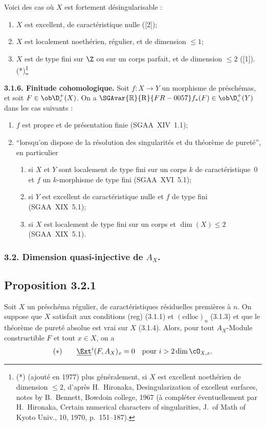 Voici des cas où $X$ est fortement désingularisable :
\begin{enumerate}
\item[a)] $X$ est excellent, de caractéristique nulle ([2]);
\item[b)] $X$ est localement noethérien, régulier, et de dimension $\leqslant 1$;
\item[c)] $X$ est de type fini sur $\Z$ ou sur un corps parfait, et de dimension $\leqslant 2$ ([1]).(*)\footnote{(*) (ajouté en 1977) plus généralement, si $X$ est excellent noethérien de dimension $\leqslant 2$, d'après H.~Hironaka, Desingularization of excellent surfaces, notes by B.~Bennett, Bowdoin college, 1967 (à compléter éventuellement par H.~Hironaka, Certain numerical characters of singularities, J.~of Math of Kyoto Univ., 10, 1970, p.~151--187).}
\end{enumerate}

\textbf{3.1.6. Finitude cohomologique.} Soit $f : X \to Y$ un morphisme de préschémas, et soit $F \in \ob \D_c^{+}(X)$. On a $\SGAvar{\mathbb{R}}{\mathrm{R}}{FR-0057} f_{*}(F) \in \ob \D_c^{+}(Y)$ dans les cas suivants :
\begin{enumerate}
\item[a)] $f$ est propre et de présentation finie (SGAA~XIV~1.1);
\item[b)] ``lorsqu'on dispose de la résolution des singularités et du théorème de pureté'', en particulier
\begin{enumerate}
\item[(i)] si $X$ et $Y$ sont localement de type fini sur un corps $k$ de caractéristique~0 et $f$ un $k$-morphisme de type fini (SGAA~XVI~5.1);
\item[(ii)] si $Y$ est excellent de caractéristique nulle et $f$ de type fini (SGAA~XIX~5.1);
\item[(iii)] si $X$ est localement de type fini sur un corps et $\dim(X) \leqslant 2$ (SGAA~XIX~5.1).
\end{enumerate}
\end{enumerate}

\subsubsection*{3.2. Dimension quasi-injective de \texorpdfstring{$A_X$}{A\_X}.}

\subsection*{Proposition 3.2.1}
Soit $X$ un préschéma régulier, de caractéristiques résiduelles premières à $n$. On suppose que $X$ satisfait aux conditions (reg) (3.1.1) et $(\mathrm{cdloc})_n$ (3.1.3) et que le théorème de pureté absolue est vrai sur $X$ (3.1.4). Alors, pour tout $A_X$-Module constructible $F$ et tout $x \in X$, on a
\[
(*) \qquad \underline{\Ext}^i(F, A_X)_x = 0 \quad \text{pour } i > 2\dim \cO_{X,x}.
\]

